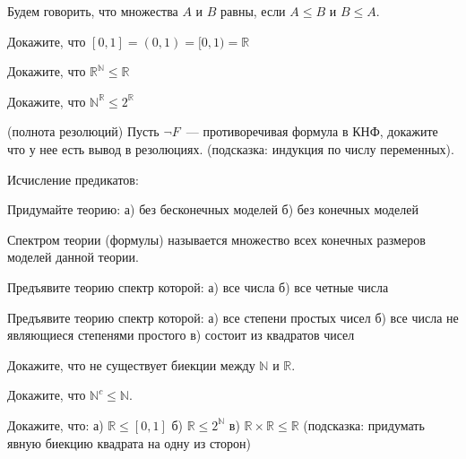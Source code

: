 \setcounter{curtask}{7}


Будем говорить, что множества $A$ и $B$ равны, если $A \le B$ и $B \le A$.

\begin{task}
    Докажите, что $[0, 1] = (0, 1) = [0, 1) = \mathbb{R}$
\end{task}

\begin{task}
    Докажите, что $\mathbb{R}^{\mathbb{N}} \le \mathbb{R}$
\end{task}

\begin{task}
    Докажите, что $\mathbb{N}^{\mathbb{R}} \le 2^{\mathbb{R}}$
\end{task}


\begin{task} (полнота резолюций)
    Пусть $\neg F$~--- противоречивая формула в КНФ, докажите что у нее есть вывод в 
    резолюциях. (подсказка: индукция по числу переменных).
\end{task}


Исчисление предикатов:

\begin{task}
    Придумайте теорию:
    а) без бесконечных моделей
    б) без конечных моделей
\end{task}

Спектром теории (формулы) называется множество всех конечных размеров моделей данной
теории.

\begin{task}
    Предъявите теорию спектр которой:
    а) все числа
    б) все четные числа
\end{task}

\begin{task}
    Предъявите теорию спектр которой:
    а) все степени простых чисел
    б) все числа не являющиеся степенями простого
    в) состоит из квадратов чисел
\end{task}


\breakline

\begin{ptask}{1}
    Докажите, что не существует биекции между $\mathbb{N}$ и $\mathbb{R}$.
\end{ptask}

\begin{ptask}{2}
    Докажите, что $\mathbb{N}^c \le \mathbb{N}$.
\end{ptask}

\begin{ptask}{3}
    Докажите, что:
    а) $\mathbb{R} \le [0, 1]$
    б) $\mathbb{R} \le 2^{\mathbb{N}}$
    в) $\mathbb{R} \times \mathbb{R} \le \mathbb{R}$ (подсказка:
	    придумать явную биекцию квадрата на одну из сторон)
\end{ptask}

